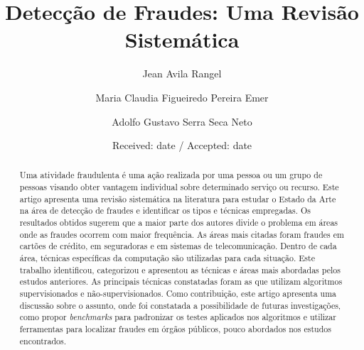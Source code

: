 \documentclass[smallextended]{svjour3}
\begin{document}
\title{Detecção de Fraudes: Uma Revisão Sistemática
}
\subtitle{}
\author{Jean Avila Rangel         \and
	Maria Claudia Figueiredo Pereira Emer \and
	Adolfo Gustavo Serra Seca Neto
}
	\date{Received: date / Accepted: date}
	\maketitle
	
	\begin{abstract}
			
Uma atividade fraudulenta é uma ação realizada por uma pessoa ou um grupo de pessoas visando obter vantagem individual sobre determinado serviço ou recurso. Este artigo apresenta uma revisão sistemática na literatura para estudar o Estado da Arte na área de detecção de fraudes e identificar os tipos e técnicas empregadas. Os resultados obtidos sugerem que a maior parte dos autores divide o problema em áreas onde as fraudes ocorrem com maior frequência. As áreas mais citadas foram fraudes em cartões de crédito, em seguradoras e em sistemas de telecomunicação. Dentro de cada área, técnicas específicas da computação são utilizadas para cada situação. Este trabalho identificou, categorizou e apresentou as técnicas e áreas mais abordadas pelos estudos anteriores. As principais técnicas constatadas foram as que utilizam algoritmos supervisionados e não-supervisionados. Como contribuição, este artigo apresenta uma discussão sobre o assunto, onde foi constatada a possibilidade de futuras investigações, como propor \emph{benchmarks} para padronizar os testes aplicados nos algoritmos e utilizar ferramentas para localizar fraudes em órgãos públicos, pouco abordados nos estudos encontrados.	
		
	\end{abstract}
	
\end{document}
